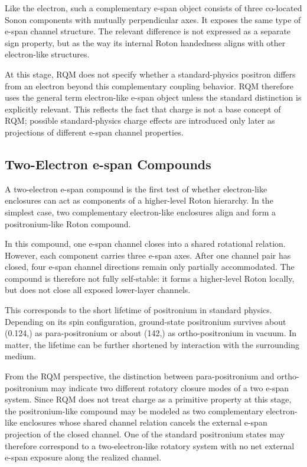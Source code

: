 \documentclass[11pt,a4paper]{article}
\begin{document}
Like the electron, such a complementary e-span object consists of three co-located Sonon components with mutually perpendicular axes. It exposes the same type of e-span channel structure. The relevant difference is not expressed as a separate sign property, but as the way its internal Roton handedness aligns with other electron-like structures.

At this stage, RQM does not specify whether a standard-physics positron differs from an electron beyond this complementary coupling behavior. RQM therefore uses the general term electron-like e-span object unless the standard distinction is explicitly relevant. This reflects the fact that charge is not a base concept of RQM; possible standard-physics charge effects are introduced only later as projections of different e-span channel properties.


\subsection{Two-Electron e-span Compounds}

A two-electron e-span compound is the first test of whether electron-like enclosures can act as components of a higher-level Roton hierarchy. In the simplest case, two complementary electron-like enclosures align and form a positronium-like Roton compound.

In this compound, one e-span channel closes into a shared rotational relation. However, each component carries three e-span axes. After one channel pair has closed, four e-span channel directions remain only partially accommodated. The compound is therefore not fully self-stable: it forms a higher-level Roton locally, but does not close all exposed lower-layer channels.

This corresponds to the short lifetime of positronium in standard physics. Depending on its spin configuration, ground-state positronium survives about (0.124,) as para-positronium or about (142,) as ortho-positronium in vacuum. In matter, the lifetime can be further shortened by interaction with the surrounding medium.

From the RQM perspective, the distinction between para-positronium and ortho-positronium may indicate two different rotatory closure modes of a two e-span system. Since RQM does not treat charge as a primitive property at this stage, the positronium-like compound may be modeled as two complementary electron-like enclosures whose shared channel relation cancels the external e-span projection of the closed channel. One of the standard positronium states may therefore correspond to a two-electron-like rotatory system with no net external e-span exposure along the realized channel.
\end{document}
